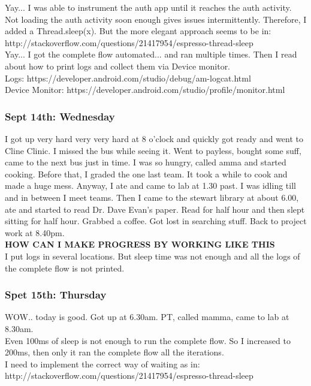 \documentclass[11pt]{article}
\begin{document}
Yay... I was able to instrument the auth app until it reaches the auth activity.\\

Not loading the auth activity soon enough gives issues intermittently. Therefore, I added a Thread.sleep(x). But the more elegant approach seems to 
be in: http://stackoverflow.com/questions/21417954/espresso-thread-sleep\\

Yay... I got the complete flow automated... and ran multiple times. Then I read about how to print logs and collect them via Device monitor.\\
Logs: https://developer.android.com/studio/debug/am-logcat.html\\
Device Monitor: https://developer.android.com/studio/profile/monitor.html\\


\subsubsection*{Sept 14th: Wednesday}
I got up very hard very very hard at 8 o'clock and quickly got ready and went to Cline Clinic. I missed the bus while seeing it. Went to payless, 
bought some suff, came to the next bus just in time. I was so hungry, called amma and started cooking. Before that, I graded the one last team.
It took a while to cook and made a huge mess. Anyway, I ate and came to lab at 1.30 past. I was idling till and in between I meet teams.
Then I came to the stewart library at about 6.00, ate and started to read Dr. Dave Evan's paper. Read for half hour and then slept sitting for half 
hour. Grabbed a coffee. Got lost in searching stuff. Back to project work at 8.40pm.\\

\textbf{HOW CAN I MAKE PROGRESS BY WORKING LIKE THIS}\\

I put logs in several locations. But sleep time was not enough and all the logs of the complete flow is not printed.

\subsubsection*{Spet 15th: Thursday}
WOW.. today is good. Got up at 6.30am. PT, called mamma, came to lab at 8.30am.\\

Even 100ms of sleep is not enough to run the complete flow. So I increased to 200ms, then only it ran the complete flow all the iterations.\\
I need to implement the correct way of waiting as in: http://stackoverflow.com/questions/21417954/espresso-thread-sleep\\
\end{document}
